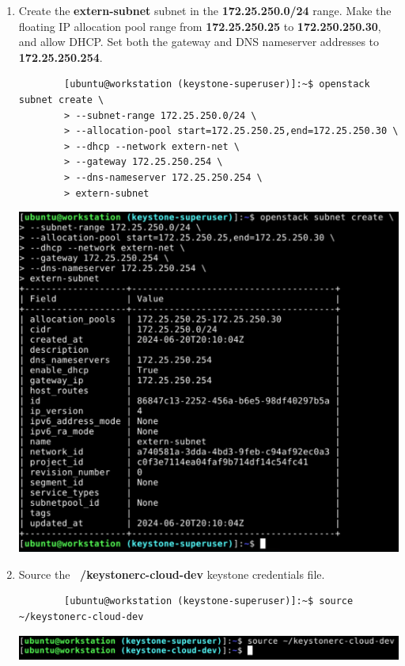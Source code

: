 \documentclass[letterpaper, 12pt]{article}
\begin{document}
\begin{enumerate}
    \item Create the \textbf{extern-subnet} subnet in the \textbf{172.25.250.0/24} range.
    Make the floating IP allocation pool range from \textbf{172.25.250.25} to \textbf{172.250.250.30}, and allow DHCP.
    Set both the gateway and DNS nameserver addresses to \textbf{172.25.250.254}.
    \begin{lstlisting}
        [ubuntu@workstation (keystone-superuser)]:~$ openstack subnet create \
        > --subnet-range 172.25.250.0/24 \
        > --allocation-pool start=172.25.250.25,end=172.25.250.30 \
        > --dhcp --network extern-net \
        > --gateway 172.25.250.254 \
        > --dns-nameserver 172.25.250.254 \
        > extern-subnet
    \end{lstlisting}

    \begin{center}
        \includegraphics[width=\linewidth]{images/part1/step22.png}
    \end{center}

    \item Source the \textbf{~/keystonerc-cloud-dev} keystone credentials file.
    \begin{lstlisting}
        [ubuntu@workstation (keystone-superuser)]:~$ source ~/keystonerc-cloud-dev
    \end{lstlisting}

    \begin{center}
        \includegraphics[width=\linewidth]{images/part1/step23.png}
    \end{center}


\end{enumerate}
\end{document}
